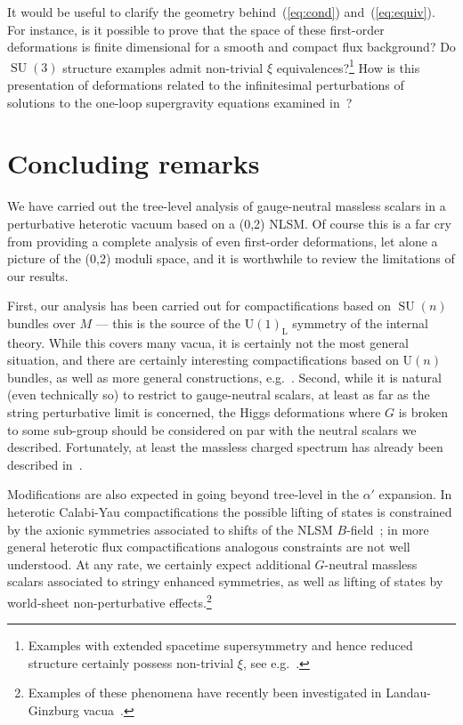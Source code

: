 \documentclass[11pt, a4paper]{article}
\def\GUL{\GU(1)_{\text{L}}}
\def\SU{\operatorname{SU}}
\def\GU{\operatorname{U{}}}
\begin{document}
It would be useful to clarify the geometry behind~(\ref{eq:cond}) and~(\ref{eq:equiv}).  For instance,
is it possible to prove that the space of these first-order deformations is finite dimensional for a smooth and compact
flux background?  Do $\SU(3)$ structure examples admit non-trivial $\xi$ equivalences?\footnote{Examples
with extended spacetime supersymmetry and hence reduced structure certainly possess
non-trivial $\xi$, see e.g.~\cite{Goldstein:2002pg}.}  How is this presentation of deformations related to 
the infinitesimal perturbations of solutions to the one-loop supergravity equations 
examined in~\cite{Becker:2006xp}?

\section{Concluding remarks} \label{s:discuss}
We have carried out the tree-level analysis of gauge-neutral massless scalars in a perturbative heterotic
vacuum based on a (0,2) NLSM.  Of course this is a far cry from providing a complete analysis of even
first-order deformations, let alone a picture of the (0,2) moduli space, and it is worthwhile to review the
limitations of our results.

First, our analysis has been carried out for compactifications based on $\SU(n)$ bundles over $M$ --- this
is the source of the $\GUL$ symmetry of the internal theory.  While this covers many vacua, it is certainly
not the most general situation, and there are certainly interesting compactifications based on $\GU(n)$
bundles, as well as more general constructions, e.g.~\cite{Blumenhagen:2005ga,Distler:2007av}.
Second, while it is natural (even technically so) to restrict to gauge-neutral scalars, at least as far as the
string perturbative limit is concerned, the Higgs deformations where $G$ is broken to some sub-group
should be considered on par with the neutral scalars we described.  Fortunately, at least the massless
charged spectrum has already been described in~\cite{Distler:1987ee}.

Modifications are also expected in going beyond tree-level in the  $\alpha'$ expansion.  In heterotic Calabi-Yau
compactifications the possible lifting of states is constrained by the axionic symmetries associated to shifts of the NLSM $B$-field~\cite{Green:1987sp,Polchinski:1998rr}; in more general heterotic flux compactifications
analogous constraints are not well understood.  At any rate, we certainly expect additional $G$-neutral massless
scalars associated to stringy enhanced symmetries, as well as lifting of states by world-sheet non-perturbative
effects.\footnote{Examples of these phenomena have recently been investigated in Landau-Ginzburg 
vacua~\cite{Aspinwall:2010ve,Aspinwall:2011us}.}
\end{document}
